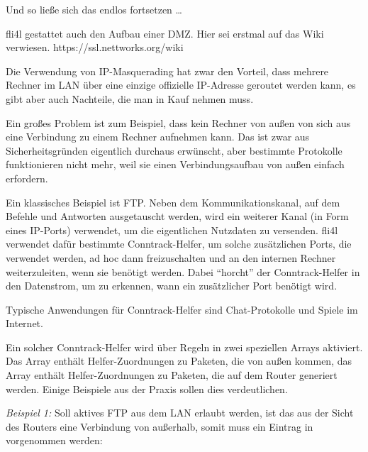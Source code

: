 Und so ließe sich das endlos fortsetzen \ldots


fli4l gestattet auch den Aufbau einer DMZ. 
Hier sei erstmal auf das Wiki verwiesen.
https://ssl.nettworks.org/wiki


  Die Verwendung von IP-Masquerading
  hat zwar den Vorteil, dass mehrere Rechner im LAN über eine
  einzige offizielle IP-Adresse geroutet werden kann, es gibt aber
  auch Nachteile, die man in Kauf nehmen muss.

  Ein großes Problem ist zum Beispiel, dass kein Rechner von außen
  von sich aus eine Verbindung zu einem Rechner aufnehmen kann.
  Das ist zwar aus Sicherheitsgründen eigentlich durchaus
  erwünscht, aber bestimmte Protokolle funktionieren nicht mehr,
  weil sie einen Verbindungsaufbau von außen einfach erfordern.

  Ein klassisches Beispiel ist FTP. Neben dem Kommunikationskanal,
  auf dem Befehle und Antworten ausgetauscht werden, wird ein
  weiterer Kanal (in Form eines IP-Ports) verwendet, um die
  eigentlichen Nutzdaten zu versenden. fli4l verwendet dafür
  bestimmte Conntrack-Helfer, um solche zusätzlichen Ports, die
  verwendet werden, ad hoc dann freizuschalten und an den internen
  Rechner weiterzuleiten, wenn sie benötigt werden. Dabei
  ``horcht'' der Conntrack-Helfer in den Datenstrom, um zu
  erkennen, wann ein zusätzlicher Port benötigt wird.

  Typische Anwendungen für Conntrack-Helfer sind
  Chat-Protokolle und Spiele im Internet.

  Ein solcher Conntrack-Helfer wird über Regeln in zwei speziellen Arrays
  aktiviert. Das Array  enthält Helfer-Zuordnungen
  zu Paketen, die von außen kommen, das Array 
  enthält Helfer-Zuordnungen zu Paketen, die auf dem Router generiert werden.
  Einige Beispiele aus der Praxis sollen dies verdeutlichen.
  
  \emph{Beispiel 1:} Soll aktives FTP aus dem LAN erlaubt werden, ist das
  aus der Sicht des Routers eine Verbindung von außerhalb, somit
  muss ein Eintrag in  vorgenommen werden:
  
